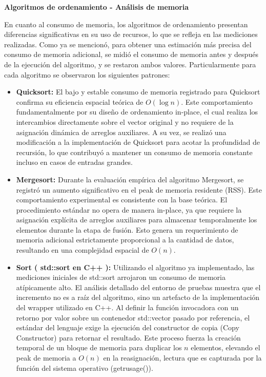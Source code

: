 \textbf{Algoritmos de ordenamiento - Análisis de memoria}

En cuanto al consumo de memoria, los algoritmos de ordenamiento presentan diferencias significativas en su uso de recursos, lo que se refleja en las mediciones realizadas. Como ya 
se mencionó, para obtener una estimación más precisa del consumo de memoria adicional, se midió el consumo de memoria antes y después de la ejecución del algoritmo, y se restaron 
ambos valores. Particularmente para cada algoritmo se observaron los siguientes patrones:

\begin{itemize}
    \item \textbf{Quicksort:} El bajo y estable consumo de memoria registrado para Quicksort confirma su eficiencia espacial teórica de $O(\log n)$. 
    Este comportamiento fundamentalmente por su diseño de ordenamiento in-place, el cual realiza los intercambios directamente sobre el vector original y no requiere 
    de la asignación dinámica de arreglos auxiliares. A su vez, se realizó una modificación a la implementación de Quicksort para acotar la profundidad de recursión, 
    lo que contribuyó a mantener un consumo de memoria constante incluso en casos de entradas grandes. 

    \item \textbf{Mergesort:} Durante la evaluación empírica del algoritmo Mergesort, se registró un aumento significativo en el peak de memoria residente (RSS). 
    Este comportamiento experimental es consistente con la base teórica. El procedimiento estándar no opera de manera in-place, 
    ya que requiere la asignación explícita de arreglos auxiliares para almacenar temporalmente los elementos durante la etapa de fusión. Esto genera un requerimiento de memoria 
    adicional estrictamente proporcional a la cantidad de datos, resultando en una complejidad espacial de $O(n)$. \cite{Cormen2009}

    \item \textbf{Sort ( std::sort en C++ ):} Utilizando el algoritmo ya implementado, las mediciones iniciales de std::sort arrojaron un consumo de memoria atípicamente alto. 
    El análisis detallado del entorno de pruebas muestra que el incremento no es a raíz del algoritmo, sino un artefacto de la implementación del wrapper utilizado en C++. 
    Al definir la función invocadora con un retorno por valor sobre un contenedor std::vector pasado por referencia, el estándar del lenguaje exige la ejecución 
    del constructor de copia (Copy Constructor) para retornar el resultado. Este proceso fuerza la creación temporal de un bloque de memoria para duplicar los $n$ 
    elementos, elevando el peak de memoria a $O(n)$ en la reasignación, lectura que es capturada por la función del sistema operativo (getrusage()). \cite{iso_cpp_2020}


\end{itemize}

